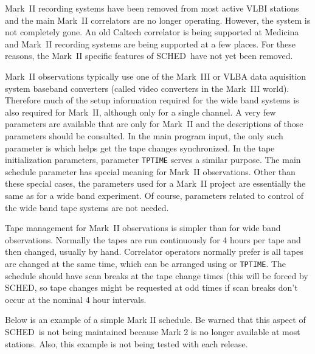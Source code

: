 \documentclass{report}
\newcommand{\sched}{{\sc SCHED}}
\newcommand{\schedb}{{\sc SCHED~}}
\begin{document}
Mark~II recording systems have been removed from most
active VLBI stations and the main Mark~II correlators are no longer
operating.  However, the system is not completely gone.  An old
Caltech correlator is being supported at Medicina and Mark~II
recording systems are being supported at a few places.  For these
reasons, the Mark~II specific features of \schedb have not
yet been removed.

Mark~II observations typically use one of the Mark~III or VLBA data
aquisition system baseband converters (called video converters in the
Mark~III world).  Therefore much of the setup information required
for the wide band systems is also required for Mark~II, although
only for a single channel.  A very few parameters are available that
are only for Mark~II and the descriptions of those parameters should
be consulted.  In the main program input, the only such parameter
is  which helps get the tape changes
synchronized.  In the tape initialization parameters, parameter
{\tt TPTIME} serves a similar purpose.  The main schedule parameter
 has special meaning for
Mark~II observations.  Other than these special cases, the parameters
used for a Mark~II project are essentially the same as for a wide
band experiment.  Of course, parameters related to control of the
wide band tape systems are not needed.

Tape management for Mark~II observations is simpler than for wide
band observations.  Normally the tapes are run continuously for
4 hours per tape and then changed, usually by hand.  Correlator
operators normally prefer is all tapes are changed at the same
time, which can be arranged using 
or {\tt TPTIME}.  The schedule should have scan breaks at the
tape change times (this will be forced by \sched, so tape
changes might be requested at odd times if scan breaks don't occur
at the nominal 4 hour intervals.

\newpage

Below is an example of a simple Mark II schedule.
Be warned that this aspect of \schedb is not being maintained
because Mark 2 is no longer available at most stations.  Also,
this example is not being tested with each release.
\end{document}
